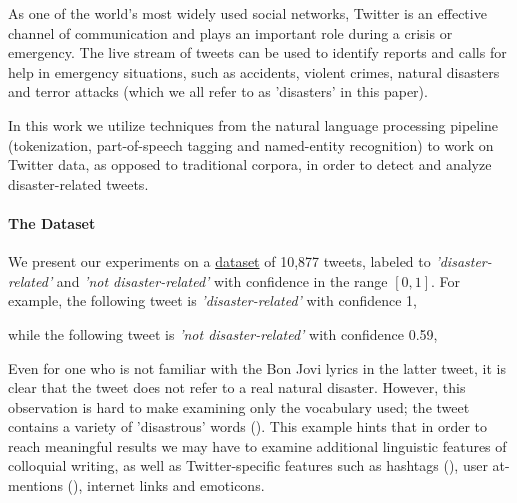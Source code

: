 \documentclass[letterpaper,twocolumn,10pt]{article}
\begin{document}
As one of the world's most widely used social networks, Twitter is an effective channel of communication and plays an important role during a crisis or emergency. The live stream of tweets can be used to identify reports and calls for help in emergency situations, such as accidents, violent crimes, natural disasters and terror attacks (which we all refer to as 'disasters' in this paper).

In this work we utilize techniques from the natural language processing pipeline (tokenization, part-of-speech tagging and named-entity recognition) to work on Twitter data, as opposed to traditional corpora, in order to detect and analyze disaster-related tweets.

\paragraph{The Dataset}
We present our experiments on a \href{https://www.crowdflower.com/data-for-everyone/}{dataset} of 10,877 tweets, labeled to \textit{'disaster-related'} and \textit{'not disaster-related'} with confidence in the range $[0,1]$. For example, the following tweet is \textit{'disaster-related'} with confidence 1,

\begin{center}
	\parbox{190pt}{}
\end{center}


while the following tweet is \textit{'not disaster-related'} with confidence 0.59,

\begin{center}
	\parbox{190pt}{}
\end{center}

Even for one who is not familiar with the Bon Jovi lyrics in the latter tweet, it is clear that the tweet does not refer to a real natural disaster. However, this observation is hard to make examining only the vocabulary used; the tweet contains a variety of 'disastrous' words  (). This example hints that in order to reach meaningful results we may have to examine additional linguistic features of colloquial writing,  as well as Twitter-specific features such as hashtags (\tweet{\textbf{\#}}), user at-mentions (), internet links and emoticons.
\end{document}
